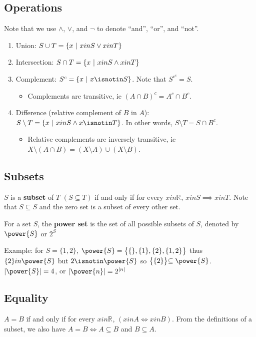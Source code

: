 \documentclass[12pt]{article}
\newcommand{\R}[1]{\mathbb{R}^{#1}}
\begin{document}
\subsection*{Operations}
Note that we use $\land$, $\lor$, and $\neg$ to denote ``and'', ``or'', and ``not''.
\begin{enumerate}
\item Union: $S \cup T = \{ x \ |\  x in S \lor x in T \}$
\item Intersection: $S \cap T = \{ x \ |\  x in S \land x in T \}$
\item Complement: $S^c = \{ x \suchthat x \isnotin S \}$. Note that $S^{c^c} = S$.
\begin{itemize}
\item Complements are transitive, ie $(A \cap B)^c = A^c \cap B^c$.
\end{itemize}
\item Difference (relative complement of $B$ in $A$): $S \setminus T = \{ x \suchthat x in S \land x \isnotin T \}$. In other words, $S \setminus T = S \cap B^c$.
\begin{itemize}
\item Relative complements are inversely transitive, ie $X \setminus (A \cap B) = (X \setminus A) \cup (X \setminus B)$.
\end{itemize}
\end{enumerate}

\subsection*{Subsets}
 $S$ is a {\bf subset} of $T$ $(S \subseteq T)$ if and only if for every $x in \R{}$, $x in S \implies x in T$. Note that $S \subseteq S$ and the zero set is a subset of every other set.

For a set $S$, the {\bf power set} is the set of all possible subsets of $S$, denoted by $\power{S}$ or $2^S$

Example: for $S = \{ 1,2 \}$, $\power{S} = \bigl\{ \{\}, \{1\}, \{2\}, \{1,2\} \bigl\}$ thus $\{2\} in \power{S}$ but $2 \isnotin \power{S}$ so $\bigl\{ \{2\} \bigl\} \subseteq \power{S}$. $|\power{S}| = 4$, or $|\power{n}| = 2^{|n|}$

\subsection*{Equality}
$A = B$ if and only if for every $x in \R{}$, $(x in A \iff x in B)$. From the definitions of a subset, we also have $A = B \iff A \subseteq B$ and $B \subseteq A$.
\end{document}
